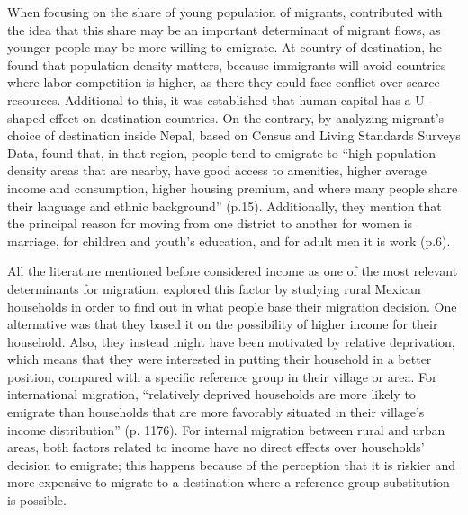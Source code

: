 \documentclass[../main.tex]{subfiles}
\begin{document}
When focusing on the share of young population of migrants,\textcite{Wesselbaum.2018}  contributed with the idea that this share may be an important determinant of migrant flows, as younger people may be more willing to emigrate. At country of destination, he found that population density matters, because immigrants will avoid countries where labor competition is higher, as there they could face conflict over scarce resources. Additional to this, it was established that human capital has a U-shaped effect on destination countries. On the contrary, by analyzing migrant’s choice of destination inside Nepal, based on Census and Living Standards Surveys Data, \parencite{Fafchamps.2012} found that, in that region, people tend to emigrate to \enquote{high population density areas that are nearby, have good access to amenities, higher average income and consumption, higher housing premium, and where many people share their language and ethnic background} (p.15). Additionally, they mention that the principal reason for moving from one district to another for women is marriage, for children and youth’s education, and for adult men it is work (p.6).

All the literature mentioned before considered income as one of the most relevant determinants for migration. \textcite{Stark.1991} explored this factor by studying rural Mexican households in order to find out in what people base their migration decision. One alternative was that they based it on the possibility of higher income for their household. Also, they instead might have been motivated by relative deprivation, which means that they were interested in putting their household in a better position, compared with a specific reference group in their village or area. For international migration, \enquote{relatively deprived households are more likely to emigrate than households that are more favorably situated in their village’s income distribution} (p. 1176). For internal migration between rural and urban areas, both factors related to income have no direct effects over households’ decision to emigrate; this happens because of the perception that it is riskier and more expensive to migrate to a destination where a reference group substitution is possible.
\end{document}
